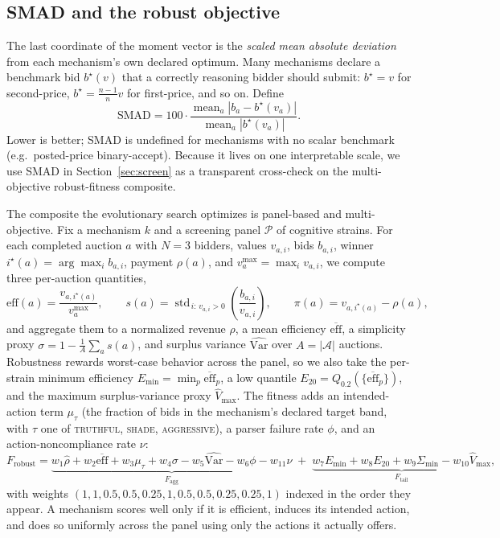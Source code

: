 \documentclass[12pt]{article}
\begin{document}
\subsection{SMAD and the robust objective}
\label{sec:smad}

The last coordinate of the moment vector is the \emph{scaled mean
absolute deviation} from each mechanism's own declared optimum. Many
mechanisms declare a benchmark bid $b^\star(v)$ that a correctly
reasoning bidder should submit: $b^\star = v$ for second-price,
$b^\star = \tfrac{n-1}{n} v$ for first-price, and so on. Define
\begin{equation}
\mathrm{SMAD}
=
100 \cdot
\frac{\operatorname{mean}_a |b_a - b^\star(v_a)|}
     {\operatorname{mean}_a |b^\star(v_a)|}.
\label{eq:smad}
\end{equation}
Lower is better; SMAD is undefined for mechanisms with no scalar
benchmark (e.g.\ posted-price binary-accept). Because it lives on one
interpretable scale, we use SMAD in Section~\ref{sec:screen} as a
transparent cross-check on the multi-objective robust-fitness
composite.

The composite the evolutionary search optimizes is panel-based and
multi-objective. Fix a mechanism $k$ and a screening panel $\mathcal{P}$
of cognitive strains. For each completed auction $a$ with
$N=3$ bidders, values $v_{a,i}$, bids $b_{a,i}$, winner
$i^\star(a)=\arg\max_i b_{a,i}$, payment $\rho(a)$, and
$v^{\max}_a=\max_i v_{a,i}$, we compute three per-auction quantities,
\begin{equation}
\mathrm{eff}(a)=\frac{v_{a,i^\star(a)}}{v^{\max}_a},
\qquad
s(a)=\operatorname{std}_{\,i:\,v_{a,i}>0}\!\left(\frac{b_{a,i}}{v_{a,i}}\right),
\qquad
\pi(a)=v_{a,i^\star(a)}-\rho(a),
\label{eq:perauction}
\end{equation}
and aggregate them to a normalized revenue $\hat\rho$, a mean
efficiency $\overline{\mathrm{eff}}$, a simplicity proxy
$\sigma = 1 - \frac{1}{A}\sum_a s(a)$, and surplus variance
$\widehat{\mathrm{Var}}$ over $A=|\mathcal{A}|$ auctions. Robustness
rewards worst-case behavior across the panel, so we also take the
per-strain minimum efficiency $E_{\min}=\min_p
\overline{\mathrm{eff}}_p$, a low quantile
$E_{20}=Q_{0.2}(\{\overline{\mathrm{eff}}_p\})$, and the maximum
surplus-variance proxy $\widehat V_{\max}$. The fitness adds an
intended-action term $\mu_\tau$ (the fraction of bids in the
mechanism's declared target band, with $\tau$ one of
\textsc{truthful}, \textsc{shade}, \textsc{aggressive}), a parser
failure rate $\phi$, and an action-noncompliance rate $\nu$:
\begin{equation}
F_{\mathrm{robust}}
=
\underbrace{
w_1\hat\rho + w_2\overline{\mathrm{eff}} + w_3\mu_\tau + w_4\sigma
- w_5\widehat{\mathrm{Var}} - w_6\phi - w_{11}\nu
}_{F_{\mathrm{agg}}}
\;+\;
\underbrace{
w_7 E_{\min} + w_8 E_{20} + w_9 \Sigma_{\min}
- w_{10}\widehat V_{\max}
}_{F_{\mathrm{tail}}},
\label{eq:frobust}
\end{equation}
with weights $(1, 1, 0.5, 0.5, 0.25, 1, 0.5, 0.5, 0.25, 0.25, 1)$
indexed in the order they appear. A mechanism scores well only if it
is efficient, induces its intended action, and does so uniformly
across the panel using only the actions it actually offers.
\end{document}
